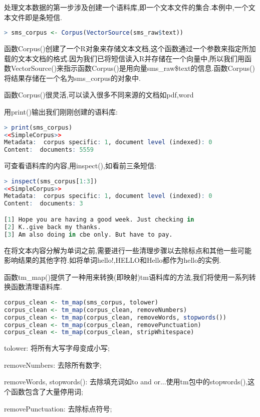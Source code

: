 \documentclass[11pt,a4paper,oneside]{book}
\begin{document}
处理文本数据的第一步涉及创建一个语料库,即一个文本文件的集合.本例中,一个文本文件即是条短信.
\begin{lstlisting}[language=r]
> sms_corpus <- Corpus(VectorSource(sms_raw$text))
\end{lstlisting}
函数Corpus()创建了一个R对象来存储文本文档,这个函数通过一个参数来指定所加载的文本文档的格式.因为我们已将短信读入R并存储在一个向量中,所以我们用函数VectorSource()来指示函数Corpus()是用向量sms\_raw\$text的信息.函数Corpus()将结果存储在一个名为sms\_corpus的对象中.
\begin{tcolorbox}[colback=pink!10!white,colframe=pink!100!black]
函数Corpus()很灵活,可以读入很多不同来源的文档如pdf,word
\end{tcolorbox}
用print()输出我们刚刚创建的语料库:
\begin{lstlisting}[language=r]
> print(sms_corpus)
<<SimpleCorpus>>
Metadata:  corpus specific: 1, document level (indexed): 0
Content:  documents: 5559
\end{lstlisting}
可查看语料库的内容,用inspect(),如看前三条短信:
\begin{lstlisting}[language=r]
> inspect(sms_corpus[1:3])
<<SimpleCorpus>>
Metadata:  corpus specific: 1, document level (indexed): 0
Content:  documents: 3

[1] Hope you are having a good week. Just checking in
[2] K..give back my thanks.                          
[3] Am also doing in cbe only. But have to pay.    
\end{lstlisting}

在将文本内容分解为单词之前,需要进行一些清理步骤以去除标点和其他一些可能影响结果的其他字符.如将单词hello!,HELLO和Hello都作为hello的实例.

函数tm\_map()提供了一种用来转换(即映射)tm语料库的方法,我们将使用一系列转换函数清理语料库.
\begin{lstlisting}[language=r]
corpus_clean <- tm_map(sms_corpus, tolower)
corpus_clean <- tm_map(corpus_clean, removeNumbers)
corpus_clean <- tm_map(corpus_clean, removeWords, stopwords())
corpus_clean <- tm_map(corpus_clean, removePunctuation)
corpus_clean <- tm_map(corpus_clean, stripWhitespace)
\end{lstlisting}

tolower: 将所有大写字母变成小写;

removeNumbers: 去除所有数字;

removeWords, stopwords(): 去除填充词如to and or...使用tm包中的stopwords(),这个函数包含了大量停用词;

removePunctuation: 去除标点符号;
\end{document}

